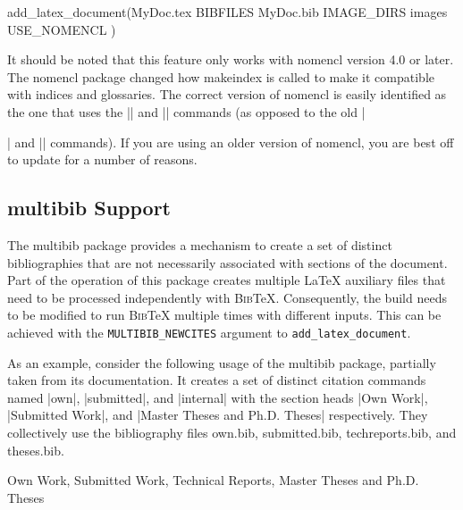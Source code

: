 \documentclass{article}
\newcommand*{\textfile}[1]{\textsf{#1}}
\newcommand*{\textprog}[1]{\textfile{#1}}
\newcommand*{\textlatexpackage}[1]{\textsf{#1}}
\newcommand*{\textcmake}[1]{\texttt{#1}}
\newcommand*{\latex}{\LaTeX\xspace}
\newcommand*{\bibtex}{\textsc{Bib}\TeX\xspace}
\newcommand*{\ald}{\textcmake{add\_latex\_document}\xspace}
\begin{document}
  \begin{CodeListing}
add_latex_document(MyDoc.tex
  BIBFILES MyDoc.bib
  IMAGE_DIRS images
  USE_NOMENCL
  )
  \end{CodeListing}

  It should be noted that this feature only works with
  \textlatexpackage{nomencl} version 4.0 or later.  The
  \textlatexpackage{nomencl} package changed how \textprog{makeindex} is
  called to make it compatible with indices and glossaries.  The correct
  version of \textlatexpackage{nomencl} is easily identified as the one
  that uses the \textlatex|\makenomenclature| and
  \textlatex|\printnomenclature| commands (as opposed to the old
  \textlatex|\makeglossary| and \textlatex|\printglossary| commands).  If
  you are using an older version of \textlatexpackage{nomencl}, you are
  best off to update for a number of reasons.

  \subsection{\textlatexpackage{multibib} Support}
  \label{sec:multibibSupport}

  The \textlatexpackage{multibib} package provides a mechanism to create a
  set of distinct bibliographies that are not necessarily associated with
  sections of the document.  Part of the operation of this package creates
  multiple \latex auxiliary files that need to be processed independently
  with \bibtex.  Consequently, the build needs to be modified to run
  \bibtex multiple times with different inputs.  This can be achieved with
  the \textcmake{MULTIBIB\_NEWCITES} argument to \ald.

  As an example, consider the following usage of the
  \textlatexpackage{multibib} package, partially taken from its
  documentation.  It creates a set of distinct citation commands named
  \textlatex|own|, \textlatex|submitted|, and \textlatex|internal| with the
  section heads \textlatex|Own Work|, \textlatex|Submitted Work|, and
  \textlatex|Master Theses and Ph.D. Theses| respectively.  They
  collectively use the bibliography files \textfile{own.bib},
  \textfile{submitted.bib}, \textfile{techreports.bib}, and
  \textfile{theses.bib}.

  \begin{CodeListing}
%
  {Own Work,%
   Submitted Work,%
   {Technical Reports, Master Theses and Ph.D. Theses}}
  \end{CodeListing}
  \begin{CodeListing}
  \end{CodeListing}
  \begin{CodeListing}
  \end{CodeListing}
  \begin{CodeListing}
  \end{CodeListing}
\end{document}
